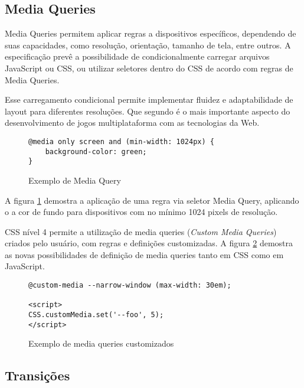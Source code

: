 \subsection{Media Queries}

Media Queries permitem aplicar regras a dispositivos específicos,
dependendo de suas capacidades, como resolução, orientação, tamanho
de tela, entre outros. A especificação prevê a possibilidade de
condicionalmente carregar arquivos JavaScript ou CSS, ou utilizar
seletores dentro do CSS de acordo com regras de Media Queries.

Esse carregamento condicional  permite implementar fluidez e
adaptabilidade de layout para diferentes resoluções. Que segundo
\citet{HTML5CrossPlatformGameDevelopment} é o mais importante aspecto do
desenvolvimento de jogos multiplataforma com as tecnologias da Web.

\begin{figure}[H]
\centering
\begin{verbatim}
@media only screen and (min-width: 1024px) {
    background-color: green;
}
\end{verbatim}
\caption{Exemplo de Media Query}
\label{fig:MediaQuery}
\end{figure}

A figura \ref{fig:MediaQuery} demostra a aplicação de uma regra via
seletor Media Query, aplicando o a cor de fundo para dispositivos com no
mínimo 1024 pixels de resolução.

CSS nível 4 permite a utilização de media queries (\textit{Custom
Media Queries}) criados pelo usuário, com regras e definições
customizadas. A figura \ref{fig:MediaQueryCustom} demostra as novas
possibilidades de definição de media queries tanto em CSS como em
JavaScript.

\begin{figure}[H]
\centering
\begin{verbatim}
@custom-media --narrow-window (max-width: 30em);

<script>
CSS.customMedia.set('--foo', 5);
</script>

\end{verbatim}
\caption{Exemplo de media queries customizados}
\label{fig:MediaQueryCustom}
\end{figure}


\subsection{Transições}


